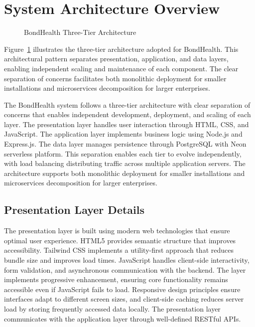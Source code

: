 \section{System Architecture Overview}

\begin{figure}[H]
\centering
{}
\caption{BondHealth Three-Tier Architecture}
\label{fig:architecture}
\end{figure}
\noindent Figure~\ref{fig:architecture} illustrates the three-tier architecture adopted for BondHealth. This architectural pattern separates presentation, application, and data layers, enabling independent scaling and maintenance of each component. The clear separation of concerns facilitates both monolithic deployment for smaller installations and microservices decomposition for larger enterprises.

\justifying
\noindent The BondHealth system follows a three-tier architecture with clear separation of concerns that enables independent development, deployment, and scaling of each layer. The presentation layer handles user interaction through HTML, CSS, and JavaScript. The application layer implements business logic using Node.js and Express.js. The data layer manages persistence through PostgreSQL with Neon serverless platform. This separation enables each tier to evolve independently, with load balancing distributing traffic across multiple application servers. The architecture supports both monolithic deployment for smaller installations and microservices decomposition for larger enterprises.

\subsection{Presentation Layer Details}

\justifying
\noindent The presentation layer is built using modern web technologies that ensure optimal user experience. HTML5 provides semantic structure that improves accessibility. Tailwind CSS implements a utility-first approach that reduces bundle size and improves load times. JavaScript handles client-side interactivity, form validation, and asynchronous communication with the backend. The layer implements progressive enhancement, ensuring core functionality remains accessible even if JavaScript fails to load. Responsive design principles ensure interfaces adapt to different screen sizes, and client-side caching reduces server load by storing frequently accessed data locally. The presentation layer communicates with the application layer through well-defined RESTful APIs.

